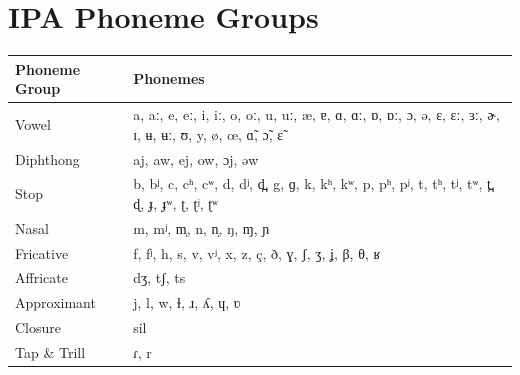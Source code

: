 \documentclass[a4paper,oneside,12pt]{book}
\title{\thesistitle}
\author{\authorname}
\numberwithin{equation}{chapter}
\begin{document}
\chapter*{IPA Phoneme Groups}

\begin{longtable}{>{\raggedright\arraybackslash}p{3cm} p{12cm}}
\toprule
\textbf{Phoneme Group} & \textbf{Phonemes} \\
\midrule
Vowel & a, aː, e, eː, i, iː, o, oː, u, uː, æ, ɐ, ɑ, ɑː, ɒ, ɒː, ɔ, ə, ɛ, ɛː, ɜː, ɚ, ɪ, ʉ, ʉː, ʊ, y, ø, œ, ɑ̃, ɔ̃, ɛ̃ \\
Diphthong & aj, aw, ej, ow, ɔj, əw \\
Stop & b, bʲ, c, cʰ, cʷ, d, dʲ, d̪, g, ɡ, k, kʰ, kʷ, p, pʰ, pʲ, t, tʰ, tʲ, tʷ, t̪, ɖ, ɟ, ɟʷ, ʈ, ʈʲ, ʈʷ \\
Nasal & m, mʲ, m̩, n, n̩, ŋ, ɱ, ɲ \\
Fricative & f, fʲ, h, s, v, vʲ, x, z, ç, ð, ɣ, ʃ, ʒ, ʝ, β, θ, ʁ \\
Affricate & dʒ, tʃ, ts \\
Approximant & j, l, w, ɫ, ɹ, ʎ, ɥ, ʋ \\
Closure & sil \\
Tap \& Trill & ɾ, r \\
\bottomrule
\end{longtable}
\end{document}
